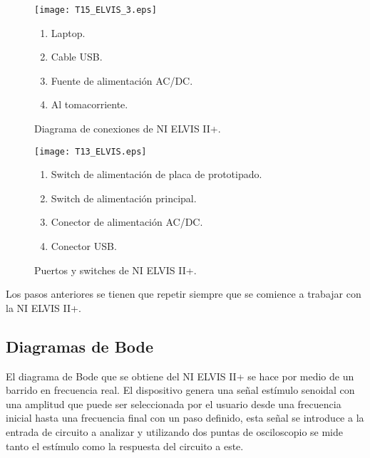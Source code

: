 	
	\begin{figure}[!ht]
		\begin{minipage}[c]{0.65\textwidth}
			\begin{center}
				\caption{Diagrama de conexiones de NI ELVIS II+.}
				\label{fig:T15_ELVIS_3}
				\texttt{[image: T15\_ELVIS\_3.eps]}
			\end{center}
		\end{minipage} \hfill \begin{minipage}[c]{0.3\textwidth}
			\begin{enumerate}
		  		\item Laptop.
				\item Cable USB.
				\item Fuente de alimentación AC/DC.
				\item Al tomacorriente.
			\end{enumerate}
		\end{minipage}
	\end{figure}
	
	
	\begin{figure}[!ht]
		\begin{minipage}[c]{0.65\textwidth}
			\begin{center}
				\caption{Puertos y switches de NI ELVIS II+.}
				\label{fig:T13_ELVIS}
				\texttt{[image: T13\_ELVIS.eps]}
			\end{center}
		\end{minipage} \hfill \begin{minipage}[c]{0.3\textwidth}
			\begin{enumerate}
		  		\item Switch de alimentación de placa de prototipado.
				\item Switch de alimentación principal.
				\item Conector de alimentación AC/DC.
				\item Conector USB.
			\end{enumerate}
		\end{minipage}
	\end{figure}
	
	Los pasos anteriores se tienen que repetir siempre que se comience a trabajar con la NI ELVIS II+.
	
		\subsection{Diagramas de Bode}\label{sec:diagrama_de_bode}
		
	El diagrama de Bode que se obtiene del NI ELVIS II+ se hace por medio de un barrido en frecuencia real. El dispositivo genera una señal estímulo senoidal con una amplitud que puede ser seleccionada por el usuario desde una frecuencia inicial hasta una frecuencia final con un paso definido, esta señal se introduce a la entrada de circuito a analizar y utilizando dos puntas de osciloscopio se mide tanto el estímulo como la respuesta del circuito a este. 
	
